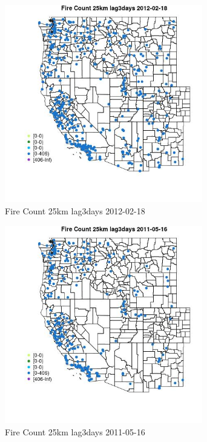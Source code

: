 \begin{figure} 
\centering  
\includegraphics[width=0.77\textwidth]{Code_Outputs/Report_ML_input_PM25_Step4_part_f_de_duplicated_aves_prioritize_24hr_obswNAs_MapObsFire_Count_25km_lag3days2012-02-18.jpg} 
\caption{\label{fig:Report_ML_input_PM25_Step4_part_f_de_duplicated_aves_prioritize_24hr_obswNAsMapObsFire_Count_25km_lag3days2012-02-18}Fire Count 25km lag3days 2012-02-18} 
\end{figure} 
 

\begin{figure} 
\centering  
\includegraphics[width=0.77\textwidth]{Code_Outputs/Report_ML_input_PM25_Step4_part_f_de_duplicated_aves_prioritize_24hr_obswNAs_MapObsFire_Count_25km_lag3days2011-05-16.jpg} 
\caption{\label{fig:Report_ML_input_PM25_Step4_part_f_de_duplicated_aves_prioritize_24hr_obswNAsMapObsFire_Count_25km_lag3days2011-05-16}Fire Count 25km lag3days 2011-05-16} 
\end{figure} 
 

